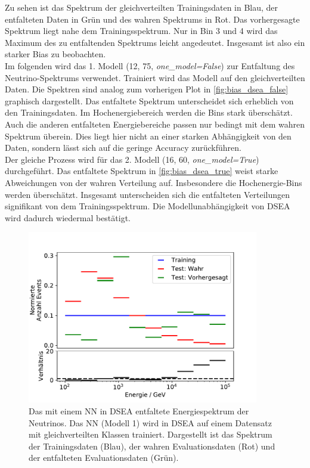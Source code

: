 Zu sehen ist das Spektrum der gleichverteilten Trainingsdaten in Blau, der entfalteten Daten in Grün und des wahren Spektrums in Rot.
Das vorhergesagte Spektrum liegt nahe dem Trainingsspektrum.
Nur in Bin 3 und 4 wird das Maximum des zu entfaltenden Spektrums leicht angedeutet.
Insgesamt ist also ein starker Bias zu beobachten.
\\
Im folgenden wird das 1. Modell (\SI{12}{}, \SI{75}{}, \textit{one\_model=False}) zur Entfaltung des Neutrino-Spektrums verwendet.
Trainiert wird das Modell auf den gleichverteilten Daten.
Die Spektren sind analog zum vorherigen Plot in \autoref{fig:bias_dsea_false} graphisch dargestellt.
Das entfaltete Spektrum unterscheidet sich erheblich von den Trainingsdaten.
Im Hochenergiebereich werden die Bins stark überschätzt.
Auch die anderen entfalteten Energiebereiche passen nur bedingt mit dem wahren Spektrum überein.
Dies liegt hier nicht an einer starken Abhängigkeit von den Daten, sondern lässt sich auf die geringe Accuracy zurückführen.
\\
Der gleiche Prozess wird für das 2. Modell (\SI{16}{}, \SI{60}{}, \textit{one\_model=True}) durchgeführt.
Das entfaltete Spektrum in \autoref{fig:bias_dsea_true} weist starke Abweichungen von der wahren Verteilung auf.
Insbesondere die Hochenergie-Bins werden überschätzt.
Insgesamt unterscheiden sich die entfalteten Verteilungen signifikant von dem Trainingsspektrum.
Die Modellunabhängigkeit von DSEA wird dadurch wiedermal bestätigt.
\begin{figure}
    \centering
    \includegraphics[width=0.9\textwidth]{Plots/BIAS/DSEA/spectrum_12it_75ep_False.pdf}
    \caption[Überprüfung des Bias: Spektrum des 1. Modells in DSEA]{Das mit einem NN in DSEA entfaltete Energiespektrum der Neutrinos.
    Das NN (Modell 1) wird in DSEA auf einem Datensatz mit gleichverteilten Klassen trainiert.
    Dargestellt ist das Spektrum der Trainingsdaten (Blau), der wahren Evaluationsdaten (Rot) und der entfalteten Evaluationsdaten (Grün).
    }
    \label{fig:bias_dsea_false}
\end{figure}
